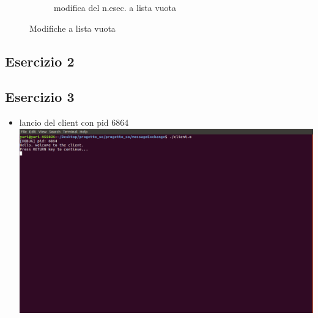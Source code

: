 \documentclass[a4paper]{article}
\begin{document}
\begin{figure}
\begin{subfigure}[b]{0.6\textwidth}
\caption{modifica del n.esec. a lista vuota}
\end{subfigure}
\caption{Modifiche a lista vuota}
\end{figure}

\subsection{Esercizio 2}
\subsection{Esercizio 3}

\begin{itemize}
\item lancio del client con pid 6864 \\
\includegraphics[scale=0.3]{screenmsg/1_client_6864}


\end{itemize}
\end{document}
